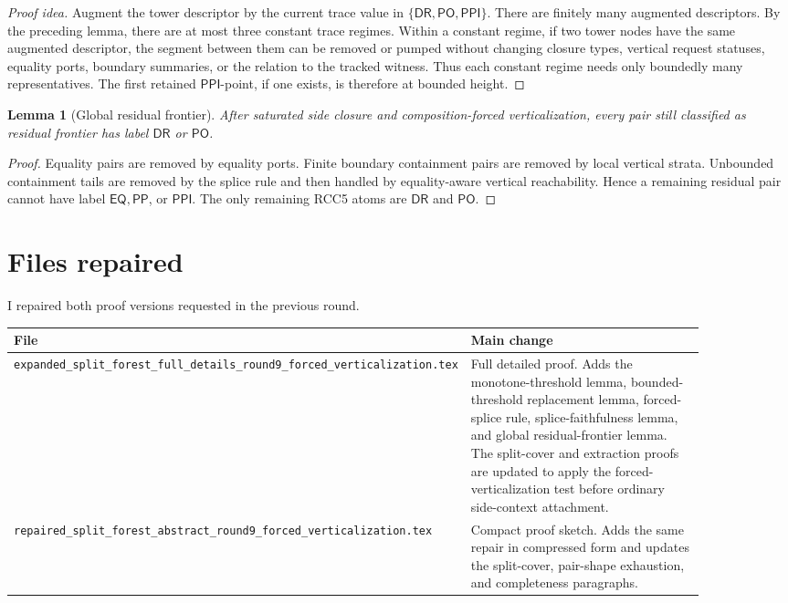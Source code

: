 \documentclass[11pt]{article}
\newtheorem{lemma}[theorem]{Lemma}
\newcommand{\EQ}{\mathsf{EQ}}
\newcommand{\DR}{\mathsf{DR}}
\newcommand{\PO}{\mathsf{PO}}
\newcommand{\PP}{\mathsf{PP}}
\newcommand{\PPI}{\mathsf{PPI}}
\begin{document}
\begin{proof}[Proof idea]
Augment the tower descriptor by the current trace value in \(\{\DR,\PO,\PPI\}\).  There are finitely many augmented descriptors.  By the preceding lemma, there are at most three constant trace regimes.  Within a constant regime, if two tower nodes have the same augmented descriptor, the segment between them can be removed or pumped without changing closure types, vertical request statuses, equality ports, boundary summaries, or the relation to the tracked witness.  Thus each constant regime needs only boundedly many representatives.  The first retained \(\PPI\)-point, if one exists, is therefore at bounded height.
\end{proof}

\begin{lemma}[Global residual frontier]
After saturated side closure and composition-forced verticalization, every pair still classified as residual frontier has label \(\DR\) or \(\PO\).
\end{lemma}

\begin{proof}
Equality pairs are removed by equality ports.  Finite boundary containment pairs are removed by local vertical strata.  Unbounded containment tails are removed by the splice rule and then handled by equality-aware vertical reachability.  Hence a remaining residual pair cannot have label \(\EQ,\PP\), or \(\PPI\).  The only remaining RCC5 atoms are \(\DR\) and \(\PO\).
\end{proof}

\section{Files repaired}

I repaired both proof versions requested in the previous round.

\begin{center}
\renewcommand{\arraystretch}{1.2}
\begin{tabular}{p{0.38\linewidth}p{0.50\linewidth}}
\toprule
File & Main change \\
\midrule
\texttt{expanded\_split\_forest\_full\_details\_round9\_forced\_verticalization.tex} & Full detailed proof.  Adds the monotone-threshold lemma, bounded-threshold replacement lemma, forced-splice rule, splice-faithfulness lemma, and global residual-frontier lemma.  The split-cover and extraction proofs are updated to apply the forced-verticalization test before ordinary side-context attachment. \\
\texttt{repaired\_split\_forest\_abstract\_round9\_forced\_verticalization.tex} & Compact proof sketch.  Adds the same repair in compressed form and updates the split-cover, pair-shape exhaustion, and completeness paragraphs. \\
\bottomrule
\end{tabular}
\end{center}
\end{document}

